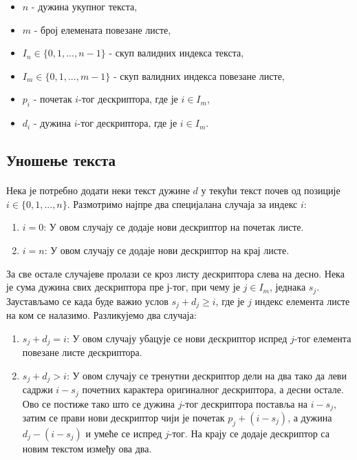 \documentclass[12pt,oneside]{memoir}
\begin{document}
\begin{itemize}
	\item \(n\) - дужина укупног текста,
	\item \(m\) - број елемената повезане листе,
	\item \(I_n \in \{0, 1,...,n-1\}\) - скуп валидних индекса текста,
	\item \(I_m \in \{0, 1,...,m-1\}\) - скуп валидних индекса повезане листе,
	\item \(p_i\) - почетак \(i\)-тог дескриптора, где је \(i \in I_m\),
	\item \(d_i\) - дужина \(i\)-тог дескриптора, где је \(i \in I_m\).
\end{itemize}

\subsection{Уношење текста}
\paragraph{}
Нека је потребно додати неки текст дужине \(d\) у текући текст почев од позиције
\(i \in \{0,1,...,n\}\). Размотримо најпре два специјалана случаја за индекс \(i\):

\begin{enumerate}
	\item \(i=0\): У овом случају се додаје нови дескриптор на почетак листе.
	\item \(i=n\): У овом случају се додаје нови дескриптор на крај листе.
\end{enumerate}

За све остале случајеве пролази се кроз листу дескриптора слева на десно. 
Нека је сума дужина свих дескриптора пре \(ј\)-тог, при чему је \(j \in I_m\), једнака \(s_j\). Заустављамо се када буде важио услов \(s_j + d_j \geq i\), где је \(j\) индекс
елемента листе на ком се налазимо. Разликујемо два случаја:

\begin{enumerate}
	\item \(s_j + d_j = i\): У овом случају убацује се нови дескриптор испред \(j\)-тог
	елемента повезане листе дескриптора.
	\item \(s_j + d_j > i\): У овом случају се тренутни дескриптор дели на два тако
	да леви садржи \(i - s_j\) почетних карактера оригиналног дескриптора, а десни остале.
	Ово се постиже тако што се дужина \(j\)-тог дескриптора поставља на \(i - s_j\), затим
	се прави нови дескриптор чији је почетак \(p_j + (i - s_j)\), а дужина \(d_j - (i - s_j)\)
	и умеће се испред \(j\)-тог. На крају се додаје дескриптор са новим текстом између ова
	два.
	
\end{enumerate}
\end{document}
